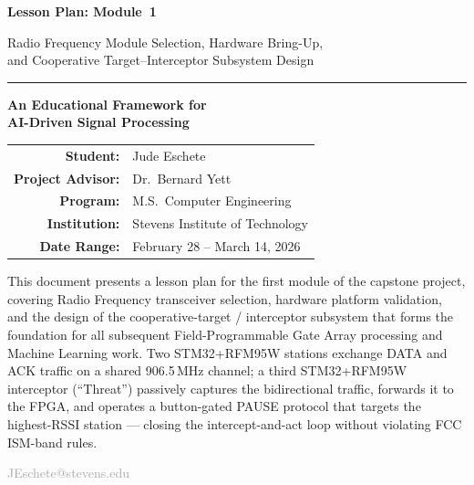 \documentclass[11pt,letterpaper]{article}
\begin{document}
	
	\begin{titlepage}
		\centering
		\vspace*{2cm}
		
		{\Huge\bfseries\color{stevens} Lesson Plan: Module~1\par}
		\vspace{0.5cm}
		{\LARGE\color{darkgray} Radio Frequency Module Selection, Hardware Bring-Up,\\[4pt]
			and Cooperative Target--Interceptor Subsystem Design\par}
		
		\vspace{1.5cm}
		\rule{0.6\textwidth}{1pt}
		\vspace{1.5cm}
		
		{\Large\textbf{An Educational Framework for\\[4pt]
				AI-Driven Signal Processing}\par}
		
		\vspace{1.5cm}
		
		\begin{tabular}{rl}
			\textbf{Student:}         & Jude Eschete \\
			\textbf{Project Advisor:} & Dr.\ Bernard Yett \\
			\textbf{Program:}         & M.S.\ Computer Engineering \\
			\textbf{Institution:}     & Stevens Institute of Technology \\
			\textbf{Date Range:}      & February 28 -- March 14, 2026 \\
		\end{tabular}
		
		\vspace{2cm}
		
		\begin{tcolorbox}[colback=lightgray, colframe=darkgray, width=0.85\textwidth, arc=2pt]
			\centering\small
			This document presents a lesson plan for the first module of the capstone project,
			covering Radio Frequency transceiver selection, hardware platform validation, and the design of the
			cooperative-target / interceptor subsystem that forms the foundation for all subsequent Field-Programmable
			Gate Array processing and Machine Learning work. Two STM32+RFM95W stations exchange DATA and ACK traffic
			on a shared 906.5\,MHz channel; a third STM32+RFM95W interceptor (``Threat'') passively captures the
			bidirectional traffic, forwards it to the FPGA, and operates a button-gated PAUSE protocol that targets
			the highest-RSSI station --- closing the intercept-and-act loop without violating FCC ISM-band rules.
		\end{tcolorbox}
		
		\vfill
		{\small\textcolor{darkgray}{JEschete@stevens.edu}}
	\end{titlepage}
	
\end{document}
